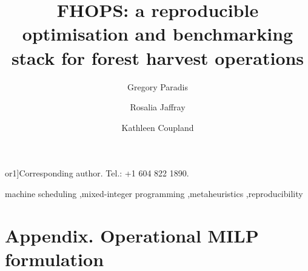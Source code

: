 \documentclass[preprint,review,12pt]{elsarticle}
\def\corref#1{}%
\def\cortext#1#2{}%
\def\ead#1{}%
\begin{document}
\begin{frontmatter}

\title{FHOPS: a reproducible optimisation and benchmarking stack for forest harvest operations}

\author[ubc]{Gregory Paradis\corref{cor1}}
\ead{gregory.paradis@ubc.ca}
\author[ubc]{Rosalia Jaffray}
\author[ubc]{Kathleen Coupland}
\cortext[cor1]{Corresponding author. Tel.: +1 604 822 1890.}
\address[ubc]{Faculty of Forestry \& Environmental Stewardship, University of British Columbia, 2424 Main Mall,
Office 4645, Vancouver, British Columbia, V6T 1Z4, Canada}





\begin{keyword}
machine scheduling \sep mixed-integer programming \sep metaheuristics \sep reproducibility
\end{keyword}




\end{frontmatter}

\linenumbers








\appendix
\section*{Appendix. Operational MILP formulation}
\label{app:formulation}




\end{document}
